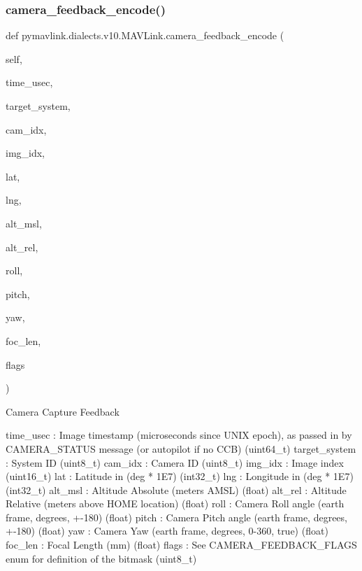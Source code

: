 \begin{DoxyVerb}
\begin{DoxyVerb}
\subsubsection{\texorpdfstring{camera\+\_\+feedback\+\_\+encode()}{camera\_feedback\_encode()}}
{\footnotesize\ttfamily def pymavlink.\+dialects.\+v10.\+M\+A\+V\+Link.\+camera\+\_\+feedback\+\_\+encode (\begin{DoxyParamCaption}\item[{}]{self,  }\item[{}]{time\+\_\+usec,  }\item[{}]{target\+\_\+system,  }\item[{}]{cam\+\_\+idx,  }\item[{}]{img\+\_\+idx,  }\item[{}]{lat,  }\item[{}]{lng,  }\item[{}]{alt\+\_\+msl,  }\item[{}]{alt\+\_\+rel,  }\item[{}]{roll,  }\item[{}]{pitch,  }\item[{}]{yaw,  }\item[{}]{foc\+\_\+len,  }\item[{}]{flags }\end{DoxyParamCaption})}

\begin{DoxyVerb}Camera Capture Feedback

time_usec                 : Image timestamp (microseconds since UNIX epoch), as passed in by CAMERA_STATUS message (or autopilot if no CCB) (uint64_t)
target_system             : System ID (uint8_t)
cam_idx                   : Camera ID (uint8_t)
img_idx                   : Image index (uint16_t)
lat                       : Latitude in (deg * 1E7) (int32_t)
lng                       : Longitude in (deg * 1E7) (int32_t)
alt_msl                   : Altitude Absolute (meters AMSL) (float)
alt_rel                   : Altitude Relative (meters above HOME location) (float)
roll                      : Camera Roll angle (earth frame, degrees, +-180) (float)
pitch                     : Camera Pitch angle (earth frame, degrees, +-180) (float)
yaw                       : Camera Yaw (earth frame, degrees, 0-360, true) (float)
foc_len                   : Focal Length (mm) (float)
flags                     : See CAMERA_FEEDBACK_FLAGS enum for definition of the bitmask (uint8_t)\end{DoxyVerb}
 \mbox{\label{classpymavlink_1_1dialects_1_1v10_1_1MAVLink_a6c15c976377eac183efcaf7034a28161}} 

\end{DoxyVerb}
\end{DoxyVerb}

